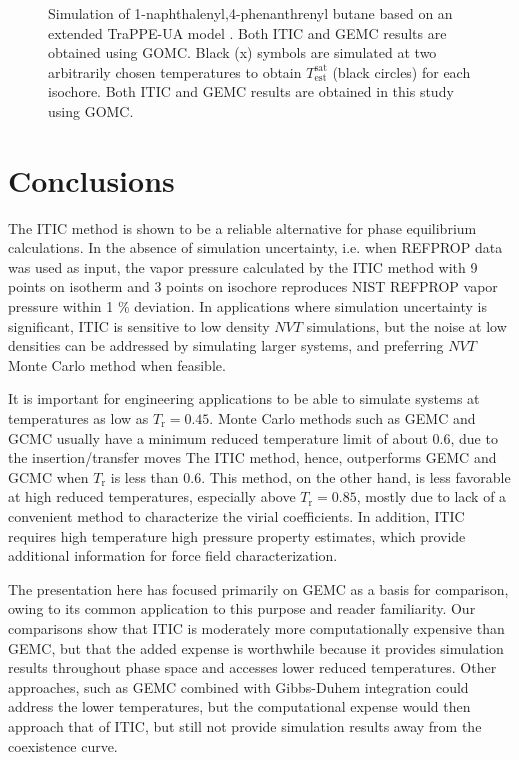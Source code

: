 \documentclass[5p,times]{elsarticle}
\begin{document}
\begin{figure}[]
\centering
{}\label{cc}
\label{aa}
\label{bb}
\caption{
Simulation of 1-naphthalenyl,4-phenanthrenyl butane based on an extended TraPPE-UA model \cite{Yiannourakou2018}. Both ITIC and GEMC results are obtained using GOMC. Black (x) symbols are simulated at two arbitrarily chosen temperatures to obtain $T_\mathrm{est}^\mathrm{sat}$ (black circles) for each isochore. Both ITIC and GEMC results are obtained in this study using GOMC.
}
\label{fig:Ex_Sim_TraPPE-1p4nB}
\end{figure}

\section{Conclusions} \label{sec:conclusion} 
The ITIC method is shown to be a reliable alternative for phase equilibrium calculations. In the absence of simulation uncertainty, i.e. when REFPROP data was used as input, the vapor pressure calculated by the ITIC method with 9 points on isotherm and 3 points on isochore reproduces NIST REFPROP vapor pressure within 1 \% deviation. In applications where simulation uncertainty is significant, ITIC is sensitive to low density $NVT$ simulations, but the noise at low densities can be addressed by simulating larger systems, and preferring $NVT$ Monte Carlo method when feasible.

It is important for engineering applications to be able to simulate systems at temperatures as low as $T_\mathrm{r}=0.45$. Monte Carlo methods such as GEMC and GCMC usually have a minimum reduced temperature limit of about 0.6, due to the insertion/transfer moves The ITIC method, hence, outperforms GEMC and GCMC when $T_\mathrm{r}$ is less than 0.6. This method, on the other hand, is less favorable at high reduced temperatures, especially above $T_\mathrm{r}=0.85$, mostly due to lack of a convenient method to characterize the virial coefficients. In addition, ITIC requires high temperature high pressure property estimates, which provide additional information for force field characterization.

The presentation here has focused primarily on GEMC as a basis for comparison, owing to its common application to this purpose and reader familiarity. Our comparisons show that ITIC is moderately more computationally expensive than GEMC, but that the added expense is worthwhile because it provides simulation results throughout phase space and accesses lower reduced temperatures. Other approaches, such as GEMC combined with Gibbs-Duhem integration could address the lower temperatures, but the computational expense would then approach that of ITIC, but still not provide simulation results away from the coexistence curve.
\end{document}

